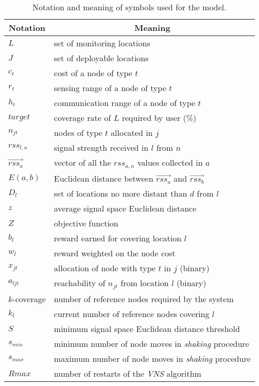 \begin{table}
\centering
\label{tab:notation}
\caption{Notation and meaning of symbols used for the model.}
\begin{tabular}{ | l | l |}
    \hline
    \multicolumn{1}{|c|}{\bfseries Notation} & \multicolumn{1}{c|}{\bfseries Meaning} \\ \hline
    $L$ & set of monitoring locations \\ \hline
    $J$ & set of deployable locations \\ \hline
    $c_t$ & cost of a node of type $t$ \\ \hline
    $r_t$ & sensing range of a node of type $t$ \\ \hline
    $h_t$ & communication range of a node of type $t$ \\ \hline
    $target$ & coverage rate of $L$ required by user (\%) \\ \hline
    $n_{jt}$ & nodes of type $t$ allocated in $j$ \\ \hline
    $rss_{l,n}$ & signal strength received in $l$ from $n$ \\ \hline
    $\vec{rss_a}$ & vector of all the $rss_{a,n}$ values collected in $a$ \\ \hline
    $E(a,b)$ & Euclidean distance between $\vec{rss_a}$ and $\vec{rss_b}$\\ \hline
    $D_l$ & set of locations no more distant than $d$ from $l$ \\ \hline
    $z$ & average signal space Euclidean distance \\ \hline
    $Z$ & objective function\\ \hline
    $b_l$ & reward earned for covering location $l$\\ \hline
    $w_l$ & reward weighted on the node cost\\ \hline
    $x_{jt}$ & allocation of node with type $t$ in $j$ (binary) \\ \hline
    $a_{ljt}$ & reachability of $n_{jt}$ from location $l$ (binary) \\ \hline
    $k$-coverage & number of reference nodes required by the system \\ \hline
    $k_l$ & current number of reference nodes covering $l$\\ \hline
    $S$ & minimum signal space Euclidean distance threshold \\ \hline
    $s_{min}$ & minimum number of node moves in \emph{shaking} procedure\\ \hline
    $s_{max}$ & maximum number of node moves in \emph{shaking} procedure\\ \hline
    $Rmax$ & number of restarts of the \emph{VNS} algorithm\\ \hline


    \end{tabular}
\end{table}

